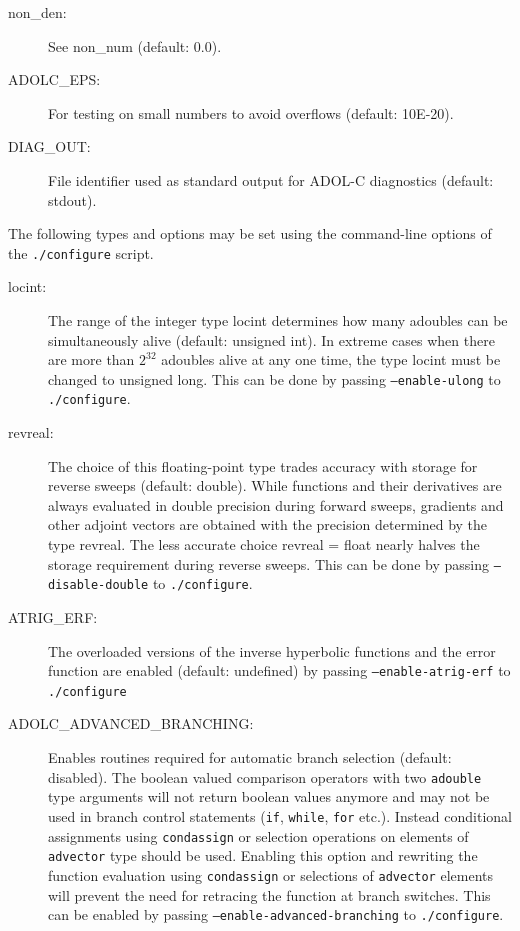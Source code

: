 \documentclass[11pt,twoside]{article}
\begin{document}
\begin{description}
\item[{\sf non\_den}{\rm :}] See {\sf non\_num} (default: 0.0).

\item[{\sf ADOLC\_EPS}{\rm :}] For testing on small numbers to avoid overflows (default: 10E-20).

\item[{\sf DIAG\_OUT}{\rm :}] File identifier used as standard output for ADOL-C diagnostics (default: stdout).
\end{description}

The following types and options may be set using the command-line
options of the \texttt{./configure} script.

\begin{description}
\item[{\sf locint}{\rm :}] The range of the integer type 
{\sf locint} determines how many {\sf adouble}s can be simultaneously
alive (default: {\sf unsigned int}).  In extreme cases when there are more than $2^{32}$ {\sf adouble}s
alive at any one time, the type {\sf locint} must be changed to 
 {\sf unsigned long}. This can be done by passing
 \texttt{--enable-ulong} to \texttt{./configure}.

\item[{\sf revreal}{\rm :}] The choice of this floating-point type
trades accuracy with storage for reverse sweeps (default: {\sf double}). While functions
and their derivatives are always evaluated in double precision 
during forward sweeps, gradients and other adjoint vectors are obtained
with the precision determined by the type {\sf revreal}. The less
accurate choice {\sf revreal} = {\sf float} nearly halves the
storage requirement during reverse sweeps. This can be done by passing
\texttt{--disable-double} to \texttt{./configure}.

\item[{\sf ATRIG\_ERF}{\rm :}] The overloaded versions of the inverse
  hyperbolic functions and the error function are enabled (default:
  undefined) by passing \texttt{--enable-atrig-erf}
  to \texttt{./configure}

\item[{\sf ADOLC\_ADVANCED\_BRANCHING}{\rm :}] Enables routines
  required for automatic branch selection (default: disabled). The
  boolean valued comparison operators with two \texttt{adouble} type
  arguments will not return boolean values anymore and may not be used
  in branch control statements (\texttt{if}, \texttt{while}, \texttt{for}
  etc.). Instead conditional assignments using \texttt{condassign} or
  selection operations on elements of \texttt{advector} type should be
  used. Enabling this option and rewriting the function evaluation
  using \texttt{condassign} or selections of \texttt{advector}
  elements will prevent the need for retracing the function at branch
  switches. This can be enabled by passing
  \texttt{--enable-advanced-branching} to \texttt{./configure}.
\end{description}
%
\end{document}
